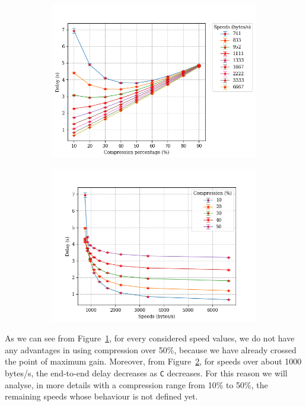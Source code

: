 \documentclass[11pt,a4paper,oneside, openright]{article}
\begin{document}
\begin{figure}[h]
\centering
\begin{subfigure}{.5\textwidth}
  \centering
  \includegraphics[width=\linewidth]{images/c-vs-delay-n-30}
  \caption{}
  \label{fig:c-vs-delay-n-30}
\end{subfigure}%
\begin{subfigure}{.5\textwidth}
  \centering
  \includegraphics[width=\linewidth]{images/s-vs-delay-n-30}
  \caption{}
  \label{fig:s-vs-delay-n-30}
\end{subfigure}
\caption{}
\label{fig:delay-n-30}
\end{figure}

As we can see from Figure~\ref{fig:c-vs-delay-n-30}, for every considered speed values, we do not have any advantages in using compression over 50\%, because we have already crossed the point of maximum gain. 
Moreover, from Figure~\ref{fig:s-vs-delay-n-30}, for speeds over about 1000 bytes/s, the end-to-end delay decreases as \texttt{C} decreases. For this reason we will analyse, in more details with a compression range from 10\% to 50\%, the remaining speeds whose behaviour is not defined yet.
\end{document}
